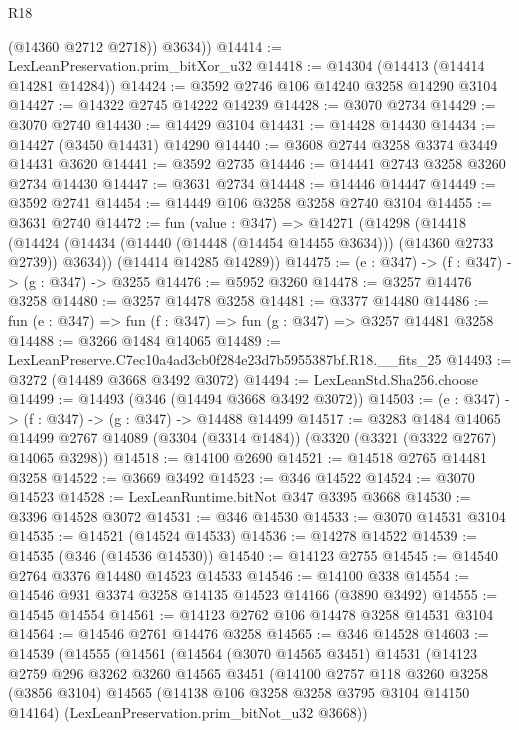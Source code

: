 \begin{lexlean}{R18}
\begin{coremodule}
          (@14360 @2712 @2718))
        @3634))
@14414 := LexLeanPreservation.prim_bitXor_u32
@14418 := @14304 (@14413 (@14414 @14281 @14284))
@14424 := @3592 @2746 @106 @14240 @3258 @14290 @3104
@14427 := @14322 @2745 @14222 @14239
@14428 := @3070 @2734
@14429 := @3070 @2740
@14430 := @14429 @3104
@14431 := @14428 @14430
@14434 := @14427 (@3450 @14431) @14290
@14440 := @3608 @2744 @3258 @3374 @3449 @14431 @3620
@14441 := @3592 @2735
@14446 := @14441 @2743 @3258 @3260 @2734 @14430
@14447 := @3631 @2734
@14448 := @14446 @14447
@14449 := @3592 @2741
@14454 := @14449 @106 @3258 @3258 @2740 @3104
@14455 := @3631 @2740
@14472 := fun (value : @347) =>
  @14271
    (@14298
      (@14418 (@14424 (@14434 (@14440 (@14448 (@14454 @14455 @3634))) (@14360 @2733 @2739)) @3634))
      (@14414 @14285 @14289))
@14475 := (e : @347) -> (f : @347) -> (g : @347) -> @3255
@14476 := @5952 @3260
@14478 := @3257 @14476 @3258
@14480 := @3257 @14478 @3258
@14481 := @3377 @14480
@14486 := fun (e : @347) => fun (f : @347) => fun (g : @347) => @3257 @14481 @3258
@14488 := @3266 @1484 @14065
@14489 := LexLeanPreserve.C7ec10a4ad3cb0f284e23d7b5955387bf.R18.__fits_25
@14493 := @3272 (@14489 @3668 @3492 @3072)
@14494 := LexLeanStd.Sha256.choose
@14499 := @14493 (@346 (@14494 @3668 @3492 @3072))
@14503 := (e : @347) -> (f : @347) -> (g : @347) -> @14488 @14499
@14517 := @3283
    @1484
    @14065
    @14499
    @2767
    @14089
    (@3304 (@3314 @1484))
    (@3320 (@3321 (@3322 @2767) @14065 @3298))
@14518 := @14100 @2690
@14521 := @14518 @2765 @14481 @3258
@14522 := @3669 @3492
@14523 := @346 @14522
@14524 := @3070 @14523
@14528 := LexLeanRuntime.bitNot @347 @3395 @3668
@14530 := @3396 @14528 @3072
@14531 := @346 @14530
@14533 := @3070 @14531 @3104
@14535 := @14521 (@14524 @14533)
@14536 := @14278 @14522
@14539 := @14535 (@346 (@14536 @14530))
@14540 := @14123 @2755
@14545 := @14540 @2764 @3376 @14480 @14523 @14533
@14546 := @14100 @338
@14554 := @14546 @931 @3374 @3258 @14135 @14523 @14166 (@3890 @3492)
@14555 := @14545 @14554
@14561 := @14123 @2762 @106 @14478 @3258 @14531 @3104
@14564 := @14546 @2761 @14476 @3258
@14565 := @346 @14528
@14603 := @14539
    (@14555
      (@14561
        (@14564
          (@3070 @14565 @3451)
          @14531
          (@14123
            @2759
            @296
            @3262
            @3260
            @14565
            @3451
            (@14100
              @2757
              @118
              @3260
              @3258
              (@3856 @3104)
              @14565
              (@14138 @106 @3258 @3258 @3795 @3104 @14150 @14164)
              (LexLeanPreservation.prim_bitNot_u32 @3668))

\end{coremodule}
\end{lexlean}
